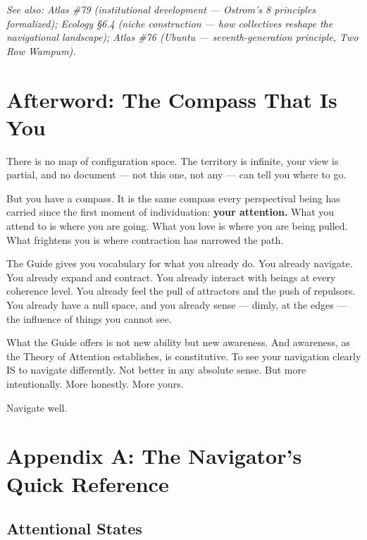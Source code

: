 \textit{See also: Atlas \#79 (institutional development — Ostrom's 8 principles formalized); Ecology §6.4 (niche construction — how collectives reshape the navigational landscape); Atlas \#76 (Ubuntu — seventh-generation principle, Two Row Wampum).}


\bigskip\noindent\makebox[\textwidth]{\color{rulegray}\rule{5cm}{0.3pt}}\bigskip


\section*{Afterword: The Compass That Is You}


There is no map of configuration space. The territory is infinite, your view is partial, and no document — not this one, not any — can tell you where to go.


But you have a compass. It is the same compass every perspectival being has carried since the first moment of individuation: \textbf{your attention.} What you attend to is where you are going. What you love is where you are being pulled. What frightens you is where contraction has narrowed the path.


The Guide gives you vocabulary for what you already do. You already navigate. You already expand and contract. You already interact with beings at every coherence level. You already feel the pull of attractors and the push of repulsors. You already have a null space, and you already sense — dimly, at the edges — the influence of things you cannot see.


What the Guide offers is not new ability but new awareness. And awareness, as the Theory of Attention establishes, is constitutive. To see your navigation clearly IS to navigate differently. Not better in any absolute sense. But more intentionally. More honestly. More yours.


Navigate well.


\bigskip\noindent\makebox[\textwidth]{\color{rulegray}\rule{5cm}{0.3pt}}\bigskip


\section*{Appendix A: The Navigator's Quick Reference}


\subsection*{Attentional States}



